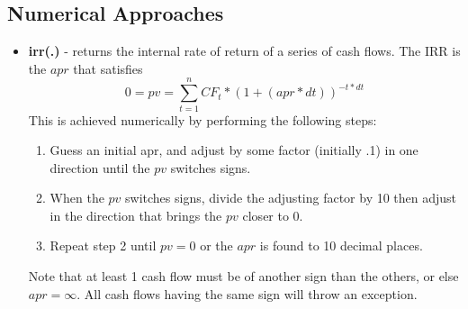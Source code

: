 \documentclass[10pt]{article}
\begin{document}
\subsection*{Numerical Approaches}
\begin{itemize}
\item \textbf{irr(.)} - returns the internal rate of return of a series of cash flows. The IRR is
    the $apr$ that satisfies\\
    \begin{equation}
        0 = pv = \sum_{t=1}^n CF_t * (1 + (apr*dt))^{-t*dt}
    \end{equation}
    This is achieved numerically by performing the following steps:
    \begin{enumerate}
    \item Guess an initial apr, and adjust by some factor (initially .1) in one direction 
            until the $pv$ switches signs.
    \item When the $pv$ switches signs, divide the adjusting factor by 10 then adjust in the direction
        that brings the $pv$ closer to 0.
    \item Repeat step 2 until $pv = 0$ or the $apr$ is found to 10 decimal places.
    \end{enumerate}
    Note that at least 1 cash flow must be of another sign than the others, or else
    $apr = \infty$. All cash flows having the same sign will throw an exception.
\end{itemize}
\end{document}

